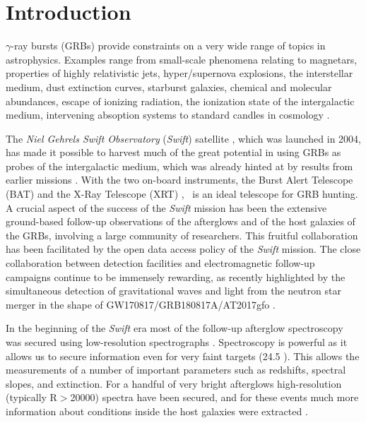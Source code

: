 \documentclass{aa}    %
\begin{document}
\maketitle

\section{Introduction}

$\gamma$-ray bursts (GRBs) provide constraints on a very wide range of topics in
astrophysics. Examples range from small-scale phenomena relating to magnetars,
properties of highly relativistic jets, hyper/supernova explosions, the
interstellar medium, dust extinction curves, starburst galaxies, chemical and
molecular abundances, escape of ionizing radiation, the ionization state of the
intergalactic medium, intervening absoption systems to standard candles in
cosmology \citep[e.g.,][]{Wijers1998, Savaglio2006, Ghirlanda2007, Molinari2007,
	Amati2008, Vergani2009, Prochaska2009, HjorthBloom2012, Rowlinson2017,
	Christensen2017}.

The \textit{Niel Gehrels Swift Observatory} ({\it Swift}) satellite
\citep{Gehrels2004, Gehrels2009}, which was launched in 2004, has made it
possible to harvest much of the great potential in using GRBs as probes of the
intergalactic medium, which was already hinted at by results from earlier
missions \citep[e.g.,][]{Paradijs2000, Ricker2004}. With the two on-board
instruments, the Burst Alert Telescope (BAT) \citep{Barthelmy2005} and the X-Ray
Telescope (XRT) \citep{Burrows2005}, \swift~is an ideal telescope for GRB
hunting. A crucial aspect of the success of the {\it Swift} mission has been the
extensive ground-based follow-up observations of the afterglows and of the host
galaxies of the GRBs, involving a large community of researchers. This fruitful
collaboration has been facilitated by the open data access policy of the
{\it Swift} mission. The close collaboration between detection facilities and
electromagnetic  follow-up campaigns continue to be immensely rewarding, as
recently highlighted by the simultaneous detection of gravitational waves and
light from the neutron star merger in the shape of GW170817/GRB180817A/AT2017gfo
\citep{LIGOScientificCollaboration2017a, LIGOScientificCollaboration2017}.

In the beginning of the {\it Swift} era most of the follow-up afterglow
spectroscopy was secured using low-resolution spectrographs \citep[typically
$R=\lambda/\Delta\lambda$$<$1000, e.g.,][]{Fynbo2009}. Spectroscopy is powerful
as it allows us to secure information even for very faint targets (24.5
\citep{Kruhler2012}). This allows the measurements of a number of important
parameters such as redshifts, spectral slopes, and extinction. For a handful of
very bright afterglows high-resolution (typically R$>$20000) spectra have been
secured, and for these events much more information about conditions inside the
host galaxies were extracted \citep[e.g.,][]{Fiore2005, Thone2007,
	Prochaska2007, Vreeswijk2007, DElia2009, Castro-Tirado2010}.
\end{document}
